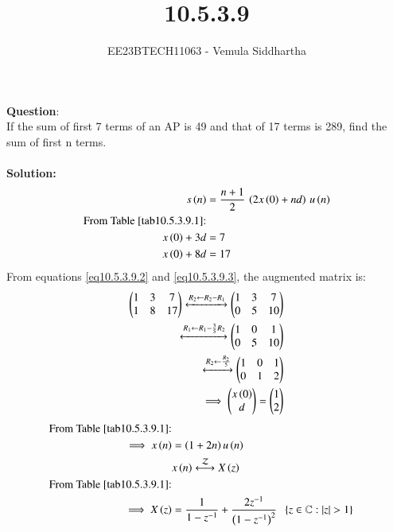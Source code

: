 \documentclass[journal,12pt,twocolumn]{IEEEtran}
\theoremstyle{remark}
\begin{document}

\vspace{3cm}

\title{10.5.3.9}
\author{EE23BTECH11063 - Vemula Siddhartha
}
\maketitle
\newpage
\bigskip

\renewcommand{\thefigure}{\theenumi}
\renewcommand{\thetable}{\theenumi}
\textbf{Question}:\\
If the sum of first 7 terms of an AP is 49 and that of 17 terms is 289, find the sum of
first n terms.
\\\\
\textbf{Solution: }
\begin{align}
s\brak{n}&=\frac{n+1}{2}\,\brak{2x\brak{0}+nd}\,u\brak{n}\label{eq10.5.3.9.1}\\
\text{From \tabref{tab10.5.3.9.1}:}\notag\\
x\brak{0}+3d&=7\label{eq10.5.3.9.2}\\
x\brak{0}+8d&=17 \label{eq10.5.3.9.3}
\end{align}
From  equations \ref{eq10.5.3.9.2} and \ref{eq10.5.3.9.3}, the augmented matrix is:
\begin{align}
 \begin{pmatrix}
   1 & 3 & 7
   \\
   1 & 8 & 17
 \end{pmatrix}
 \xleftrightarrow[]{R_2 \leftarrow {R_2-R_1}}
 \begin{pmatrix}
   1 & 3 & 7
   \\
   0 & 5 & 10
 \end{pmatrix}
 \\
 \xleftrightarrow[]{R_1 \leftarrow {R_1-\frac{3}{5}R_2}}
 \begin{pmatrix}
   1 & 0 & 1
   \\
   0 & 5 & 10
 \end{pmatrix}
 \\
 \xleftrightarrow[]{R_2 \leftarrow \frac{R_2}{5}}
 \begin{pmatrix}
   1 & 0 & 1
   \\
   0 & 1 & 2
 \end{pmatrix}
 \\
 \implies \begin{pmatrix}
   x\left(0\right)
   \\
   d
 \end{pmatrix}
 =
 \begin{pmatrix}
   1
   \\
   2
 \end{pmatrix}
\end{align}
\begin{align}
    \text{From \tabref{tab10.5.3.9.1}:}\notag\\
    \implies x\brak{n}&= \brak{1+2n}u\brak{n}\\
    &x\brak{n}\system{Z}X\brak{z}\notag\\
    \text{From \tabref{tab10.5.3.9.1}:}\notag\\
    \implies X\brak{z}&=\frac{1}{1-z^{-1}}+\frac{2z^{-1}}{\brak{1-z^{-1}}^2}\;\;\cbrak{z\in\mathbb{C}: |z|>1}
\end{align}
\end{document}
